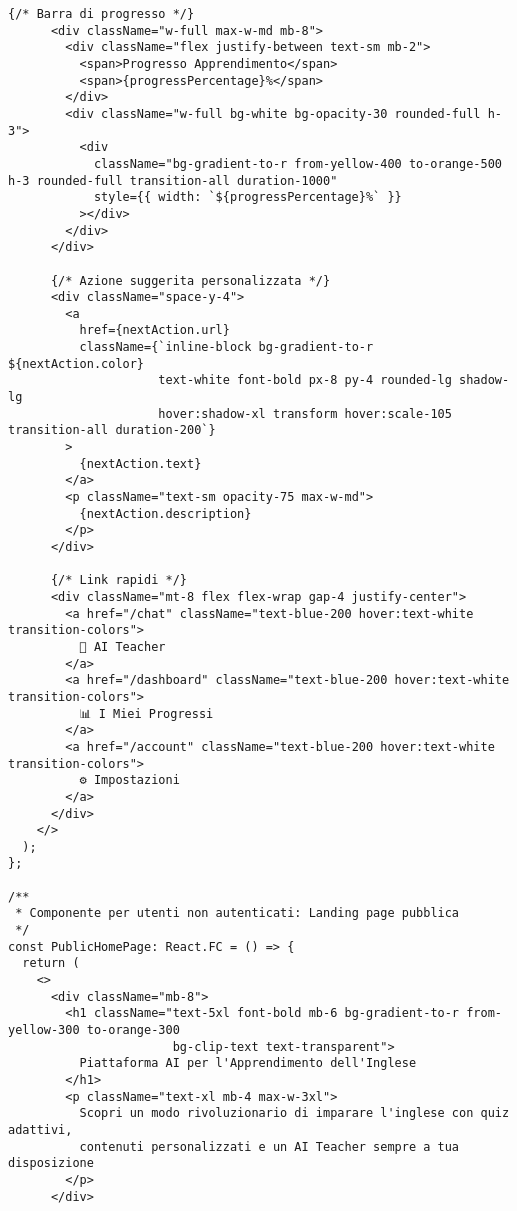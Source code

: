\documentclass[a4paper, 14pt, oneside]{extbook}
\begin{document}
\begin{lstlisting}[style=javascriptstyle, caption=Componente App React - Orchestrazione Intelligente, label=lst:app-component]
      {/* Barra di progresso */}
      <div className="w-full max-w-md mb-8">
        <div className="flex justify-between text-sm mb-2">
          <span>Progresso Apprendimento</span>
          <span>{progressPercentage}%</span>
        </div>
        <div className="w-full bg-white bg-opacity-30 rounded-full h-3">
          <div 
            className="bg-gradient-to-r from-yellow-400 to-orange-500 h-3 rounded-full transition-all duration-1000"
            style={{ width: `${progressPercentage}%` }}
          ></div>
        </div>
      </div>

      {/* Azione suggerita personalizzata */}
      <div className="space-y-4">
        <a
          href={nextAction.url}
          className={`inline-block bg-gradient-to-r ${nextAction.color} 
                     text-white font-bold px-8 py-4 rounded-lg shadow-lg 
                     hover:shadow-xl transform hover:scale-105 transition-all duration-200`}
        >
          {nextAction.text}
        </a>
        <p className="text-sm opacity-75 max-w-md">
          {nextAction.description}
        </p>
      </div>

      {/* Link rapidi */}
      <div className="mt-8 flex flex-wrap gap-4 justify-center">
        <a href="/chat" className="text-blue-200 hover:text-white transition-colors">
          💬 AI Teacher
        </a>
        <a href="/dashboard" className="text-blue-200 hover:text-white transition-colors">
          📊 I Miei Progressi
        </a>
        <a href="/account" className="text-blue-200 hover:text-white transition-colors">
          ⚙️ Impostazioni
        </a>
      </div>
    </>
  );
};

/**
 * Componente per utenti non autenticati: Landing page pubblica
 */
const PublicHomePage: React.FC = () => {
  return (
    <>
      <div className="mb-8">
        <h1 className="text-5xl font-bold mb-6 bg-gradient-to-r from-yellow-300 to-orange-300 
                       bg-clip-text text-transparent">
          Piattaforma AI per l'Apprendimento dell'Inglese
        </h1>
        <p className="text-xl mb-4 max-w-3xl">
          Scopri un modo rivoluzionario di imparare l'inglese con quiz adattivi, 
          contenuti personalizzati e un AI Teacher sempre a tua disposizione
        </p>
      </div>


\end{lstlisting}
\end{document}
